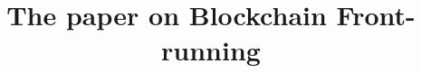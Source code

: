 \documentclass[envcountsect]{llncs}
\begin{document}
\frontmatter
\mainmatter

\title{The paper on \Large \bf Blockchain Front-running}





\maketitle














\clearpage
\appendix
\end{document}
